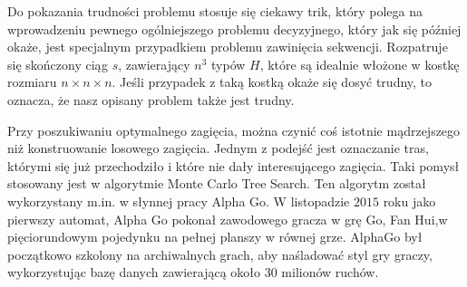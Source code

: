 \documentclass[leqno,10pt]{article}
\begin{document}
Do pokazania trudności problemu stosuje się ciekawy trik, który polega na wprowadzeniu
pewnego ogólniejszego problemu decyzyjnego, który jak się później okaże, jest
specjalnym przypadkiem problemu zawinięcia sekwencji. Rozpatruje się skończony ciąg $s$, zawierający $n^{3}$ typów $H$, które są idealnie włożone w kostkę rozmiaru $n \times n \times n$. Jeśli przypadek z taką kostką okaże się dosyć trudny, to oznacza, że nasz opisany problem także jest trudny. 

Przy poszukiwaniu optymalnego zagięcia, można czynić coś istotnie mądrzejszego niż konstruowanie losowego zagięcia. Jednym z podejść jest oznaczanie tras, którymi się już przechodziło i które nie dały interesującego zagięcia. Taki pomysł stosowany jest w algorytmie Monte Carlo Tree Search. Ten algorytm został wykorzystany m.in. w słynnej pracy Alpha Go. W listopadzie $2015$ roku jako pierwszy automat, Alpha Go pokonał zawodowego gracza w grę Go, Fan Hui,w pięciorundowym pojedynku na pełnej planszy w równej grze. AlphaGo był początkowo szkolony na archiwalnych grach, aby naśladować styl gry graczy, wykorzystując bazę danych zawierającą około $30$ milionów ruchów. 
\end{document}
